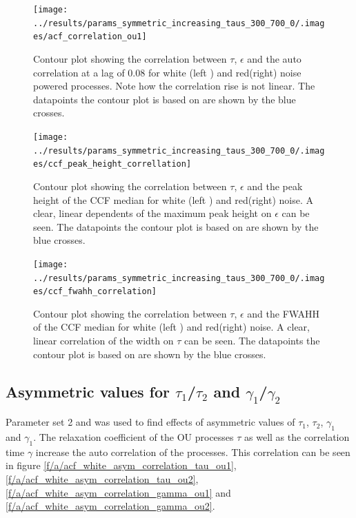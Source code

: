 \documentclass[a4paper,12pt,oneside]{book}
\theoremstyle{break}
\begin{document}
\begin{figure}
	\texttt{[image: ../results/params\_symmetric\_increasing\_taus\_300\_700\_0/.images/acf\_correlation\_ou1]}%
	\caption{Contour plot showing the correlation between $\tau$, $\epsilon$ and the auto correlation at a lag of 0.08 for white (left ) and red(right) noise powered processes. Note how the correlation rise is not linear. The datapoints  the contour plot is based on are shown by the blue crosses.}%
	\label{f/r/acf_white_sym_correlation}%
\end{figure}

\begin{figure}
	\texttt{[image: ../results/params\_symmetric\_increasing\_taus\_300\_700\_0/.images/ccf\_peak\_height\_correllation]}%
	\caption{Contour plot showing the correlation between $\tau$, $\epsilon$ and the peak height of the CCF median for white (left ) and red(right) noise. A clear, linear dependents of the maximum peak height on $\epsilon$ can be seen. The datapoints  the contour plot is based on are shown by the blue crosses.}%
	\label{f/r/ccf_white_sym_correlation_height}
\end{figure}

\begin{figure}
	\texttt{[image: ../results/params\_symmetric\_increasing\_taus\_300\_700\_0/.images/ccf\_fwahh\_correlation]}%
	\caption{Contour plot showing the correlation between $\tau$, $\epsilon$ and the \ac{FWAHH} of the CCF median for white (left ) and red(right) noise. A clear, linear correlation of the width on $\tau$ can be seen. The datapoints  the contour plot is based on are shown by the blue crosses. }%
	\label{f/r/ccf_white_sym_correlation_width}
\end{figure}

\subsection{Asymmetric values for $\tau_1$/$\tau_2$ and $\gamma_1$/$\gamma_2$}\label{s/r/correlation_asym}
Parameter set 2 and was used to find effects of asymmetric values of $\tau_1$, $\tau_2$, $\gamma_1$ and $\gamma_1$.
The relaxation coefficient of the \ac{OU} processes $\tau$ as well as the correlation time $\gamma$ increase the auto correlation of the processes.
This correlation can be seen in figure \ref{f/a/acf_white_asym_correlation_tau_ou1}, \ref{f/a/acf_white_asym_correlation_tau_ou2}, \ref{f/a/acf_white_asym_correlation_gamma_ou1} and \ref{f/a/acf_white_asym_correlation_gamma_ou2}.
\end{document}
